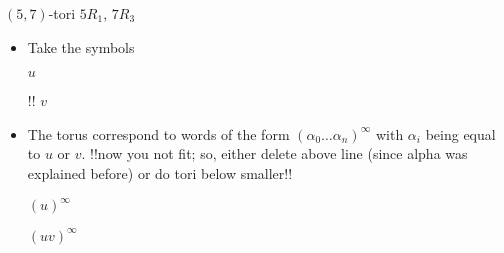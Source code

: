 \documentclass[%
pdf,
colorBG,
slideColor,
]{prosper}
\begin{document}
\begin{slide}{$(5,7)$-tori $5R_1$, $7R_3$}
\begin{itemize}
\item Take the symbols
\begin{center}
\begin{minipage}{5.3cm}
\centering
{}\par
$u$
\end{minipage}
\begin{minipage}{5.3cm}
\centering
{}\par
!!%
$v$
\end{minipage}
\end{center}
\item The torus correspond to words of the form 
$(\alpha_0\dots\alpha_n)^{\infty}$ 
with $\alpha_i$ being equal to $u$ or $v$.
!!now you not fit; so, either delete above line (since alpha was 
explained before) or do tori below smaller!!
\begin{center}
\begin{minipage}{5.2cm}
\centering
{}\par
$(u)^{\infty}$
\end{minipage}
\begin{minipage}{5.2cm}
\centering
{}\par
$(uv)^{\infty}$
\end{minipage}
\end{center}

\end{itemize}
\end{slide}
\end{document}
